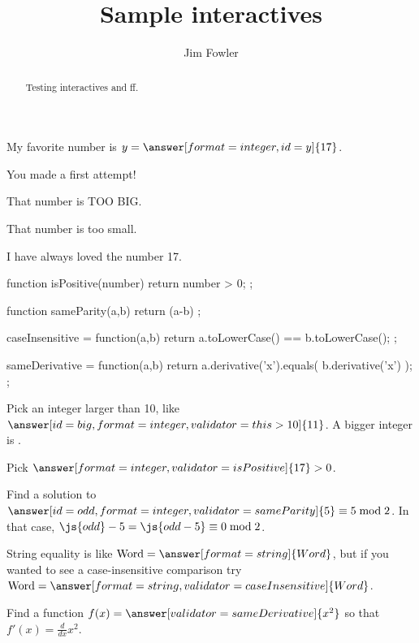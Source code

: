 \documentclass{ximera}
\title{Sample interactives}
\author{Jim Fowler}
\begin{document}
\begin{abstract}
Testing interactives and ff.
\end{abstract}
\maketitle

\begin{problem}
  My favorite number is $y = \answer[format=integer,id=y]{17}$.

  \begin{feedback}[attempt]
    You made a first attempt!
  \end{feedback}






  \begin{feedback}[y>17]
    That number is TOO BIG.
  \end{feedback}

  \begin{feedback}[y<17]
    That number is too small.
  \end{feedback}

  \begin{feedback}[correct]
    I have always loved the number 17.
  \end{feedback}
\end{problem}

\begin{javascript}
  function isPositive(number) {
    return number > 0;
  };

  function sameParity(a,b) {
    return (a-b)%
  };

  caseInsensitive = function(a,b) {
    return a.toLowerCase() == b.toLowerCase();
  };

  sameDerivative = function(a,b) {
    return a.derivative('x').equals( b.derivative('x') );
  };
\end{javascript}

\begin{problem}
  Pick an integer larger than 10, like $\answer[id=big,format=integer,validator=this>10]{11}$.  A bigger integer is .

  Pick $\answer[format=integer,validator=isPositive]{17} > 0$.

  Find a solution to $\answer[id=odd,format=integer,validator=sameParity]{5} \equiv 5 \bmod 2$.  In that case, $\js{odd} - 5 = \js{odd-5} \equiv 0 \bmod 2$.

  String equality is like $\mbox{Word} = \answer[format=string]{Word}$, but if you wanted to see a case-insensitive comparison try $\mbox{Word} = \answer[format=string,validator=caseInsensitive]{Word}$.

  Find a function $f(x) = \answer[validator=sameDerivative]{x^2}$ so that $f'(x) = \frac{d}{dx} x^2$.
\end{problem}
\end{document}
